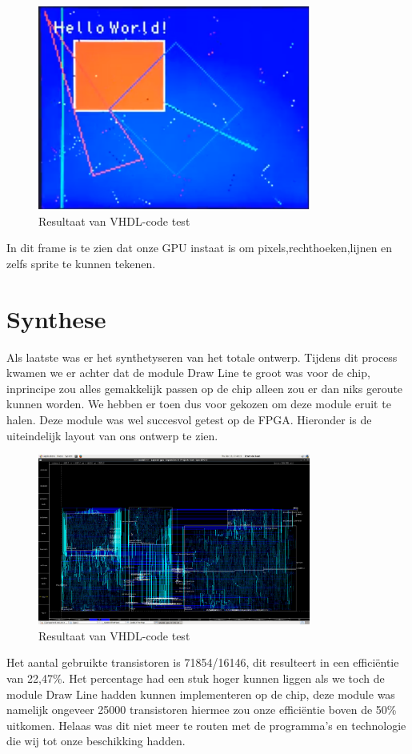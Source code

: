 \documentclass{scrartcl} %
\begin{document}
\begin{figure}[H]
	\centering
	\includegraphics[width=0.8\textwidth]{FPGAtest}
	\caption{Resultaat van VHDL-code test}
\end{figure}

In dit frame is te zien dat onze GPU instaat is om pixels,rechthoeken,lijnen en zelfs sprite te kunnen tekenen.


\section{Synthese}

Als laatste was er het synthetyseren van het totale ontwerp. Tijdens dit process kwamen we er achter dat de module Draw Line te groot was voor de chip, inprincipe zou alles gemakkelijk passen op de chip alleen zou er dan niks geroute kunnen worden. We hebben er toen dus voor gekozen om deze module eruit te halen. Deze module was wel succesvol getest op de FPGA. Hieronder is de uiteindelijk layout van ons ontwerp te zien.


\begin{figure}[H]
	\centering
	\includegraphics[width=0.8\textwidth]{layout}
	\caption{Resultaat van VHDL-code test}
\end{figure}

Het aantal gebruikte transistoren is 71854/16146, dit resulteert in een efficiëntie van 22,47\%. Het percentage had een stuk hoger kunnen liggen als we toch de module Draw Line hadden kunnen implementeren op de chip, deze module was namelijk ongeveer 25000 transistoren hiermee zou onze efficiëntie boven de 50\% uitkomen. Helaas was dit niet meer te routen met de programma's en technologie die wij tot onze beschikking hadden.
\end{document}
